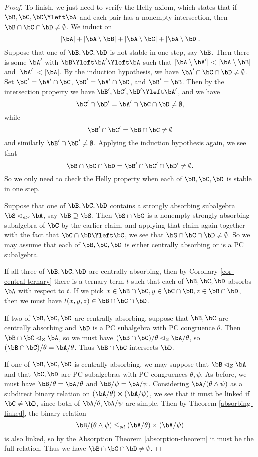 \begin{proof}
To finish, we just need to verify the Helly axiom, which states that if $\bB,\bC,\bD \Yleft \bA$ and each pair has a nonempty intersection, then $\bB \cap \bC \cap \bD \ne \emptyset$. We induct on
\[
|\bA| + |\bA\setminus \bB| + |\bA \setminus \bC| + |\bA \setminus \bD|.
\]
Suppose that one of $\bB,\bC,\bD$ is not stable in one step, say $\bB$. Then there is some $\bA'$ with $\bB \Yleft \bA' \Yleft \bA$ such that $|\bA \setminus \bA'| < |\bA \setminus \bB|$ and $|\bA'| < |\bA|$. By the induction hypothesis, we have $\bA' \cap \bC \cap \bD \ne \emptyset$. Set $\bC' = \bA' \cap \bC$, $\bD' = \bA' \cap \bD$, and $\bB' = \bB$. Then by the intersection property we have $\bB', \bC', \bD' \Yleft \bA'$, and we have
\[
\bC' \cap \bD' = \bA' \cap \bC \cap \bD \ne \emptyset,
\]
while
\[
\bB' \cap \bC' = \bB \cap \bC \ne \emptyset
\]
and similarly $\bB' \cap \bD' \ne \emptyset$. Applying the induction hypothesis again, we see that
\[
\bB \cap \bC \cap \bD = \bB' \cap \bC' \cap \bD' \ne \emptyset.
\]
So we only need to check the Helly property when each of $\bB, \bC, \bD$ is stable in one step.

Suppose that one of $\bB, \bC, \bD$ contains a strongly absorbing subalgebra $\bS \lhd_{str} \bA$, say $\bB \supseteq \bS$. Then $\bS \cap \bC$ is a nonempty strongly absorbing subalgebra of $\bC$ by the earlier claim, and applying that claim again together with the fact that $\bC \cap \bD \Yleft \bC$, we see that $\bS \cap \bC \cap \bD \ne \emptyset$. So we may assume that each of $\bB, \bC, \bD$ is either centrally absorbing or is a PC subalgebra.

If all three of $\bB, \bC, \bD$ are centrally absorbing, then by Corollary \ref{cor-central-ternary} there is a ternary term $t$ such that each of $\bB, \bC, \bD$ absorbs $\bA$ with respect to $t$. If we pick $x \in \bB \cap \bC, y \in \bC \cap \bD, z \in \bB \cap \bD$, then we must have $t(x,y,z) \in \bB \cap \bC \cap \bD$.

If two of $\bB,\bC,\bD$ are centrally absorbing, suppose that $\bB, \bC$ are centrally absorbing and $\bD$ is a PC subalgebra with PC congruence $\theta$. Then $\bB \cap \bC \lhd_Z \bA$, so we must have $(\bB\cap \bC)/\theta \lhd_Z \bA/\theta$, so $(\bB \cap \bC)/\theta = \bA/\theta$. Thus $\bB \cap \bC$ intersects $\bD$.

If one of $\bB,\bC,\bD$ is centrally absorbing, we may suppose that $\bB \lhd_Z \bA$ and that $\bC, \bD$ are PC subalgebras with PC congruences $\theta, \psi$. As before, we must have $\bB/\theta = \bA/\theta$ and $\bB/\psi = \bA/\psi$. Considering $\bA/(\theta \wedge \psi)$ as a subdirect binary relation on $(\bA/\theta)\times (\bA/\psi)$, we see that it must be linked if $\bC \ne \bD$, since both of $\bA/\theta, \bA/\psi$ are simple. Then by Theorem \ref{absorbing-linked}, the binary relation
\[
\bB/(\theta \wedge \psi) \le_{sd} (\bA/\theta) \times (\bA/\psi)
\]
is also linked, so by the Absorption Theorem \ref{absorption-theorem} it must be the full relation. Thus we have $\bB \cap \bC \cap \bD \ne \emptyset$.


\end{proof}
